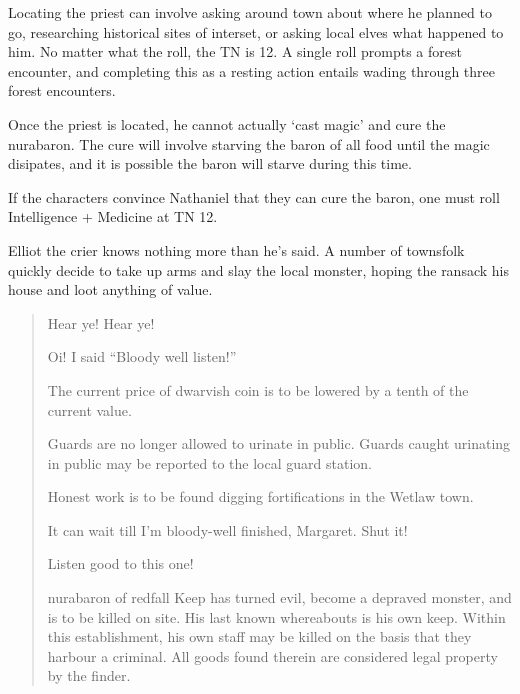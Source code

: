\begin{multicols}{2}
Locating the priest can involve asking around town about where he planned to go, researching historical sites of interset, or asking local elves what happened to him.
No matter what the roll, the TN is 12.
A single roll prompts a forest encounter, and completing this as a resting action entails wading through three forest encounters.

Once the priest is located, he cannot actually `cast magic' and cure the \gls{nurabaron}.
The cure will involve starving the baron of all food until the magic disipates, and it is possible the baron will starve during this time.

If the characters convince Nathaniel that they can cure the baron, one must roll Intelligence + Medicine at TN 12.

\label{nathaniel}

\humandiplomat


Elliot the crier knows nothing more than he's said.  A number of townsfolk quickly decide to take up arms and slay the local monster, hoping the ransack his house and loot anything of value.

\vfill\null

\begin{boxtext}

	\begin{verse}

		Hear ye! Hear ye!

		Oi! I said ``Bloody well listen!''

		The current price of dwarvish coin is to be lowered by a tenth of the current value.

		Guards are no longer allowed to urinate in public.
		Guards caught urinating in public may be reported to the local guard station.

		Honest work is to be found digging fortifications in the Wetlaw town.

		It can wait till I'm bloody-well finished, Margaret.  Shut it!

		Listen good to this one!

		\gls{nurabaron} of \gls{redfall} Keep has turned evil, become a depraved monster, and is to be killed on site.  His last known whereabouts is his own keep.  Within this establishment, his own staff may be killed on the basis that they harbour a criminal.  All goods found therein are considered legal property by the finder.


\end{verse}
\end{boxtext}
\end{multicols}
